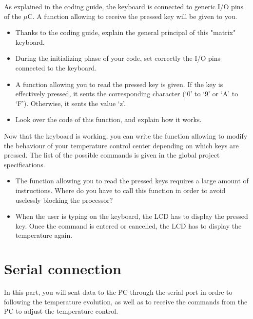 \documentclass[11pt,a4paper]{article}
\theoremstyle{definition}%
\begin{document}
As explained in the coding guide, the keyboard is connected to generic I/O pins of the $\mu$C.
A function allowing to receive the pressed key will be given to you.


\begin{itemize}
	\item Thanks to the coding guide, explain the general principal of this "matrix" keyboard.
	\item During the initializing phase of your code, set correctly the I/O pins connected to the keyboard.
	\item A function allowing you to read the pressed key is given.
	If the key is effectively pressed, it sents the corresponding character (‘0’ to ‘9’ or ‘A’ to ‘F’).
	Otherwise, it sents the value ‘z’.
	\item Look over the code of this function, and explain how it works.
\end{itemize}

Now that the keyboard is working, you can write the function allowing to modify the behaviour of your temperature control center depending on which keys are pressed.
The list of the possible commands is given in the global project specifications.
\begin{itemize}
	\item The function allowing you to read the pressed keys requires a large amount of instructions.
	Where do you have to call this function in order to avoid uselessly blocking the processor?
	\item When the user is typing on the keyboard, the LCD has to display the pressed key.
	Once the command is entered or cancelled, the LCD has to display the temperature again.
\end{itemize}









\section{Serial connection}
In this part, you will sent data to the PC through the serial port in ordre to following the temperature evolution, as well as to receive the commands from the PC to adjust the temperature control.
\end{document}

